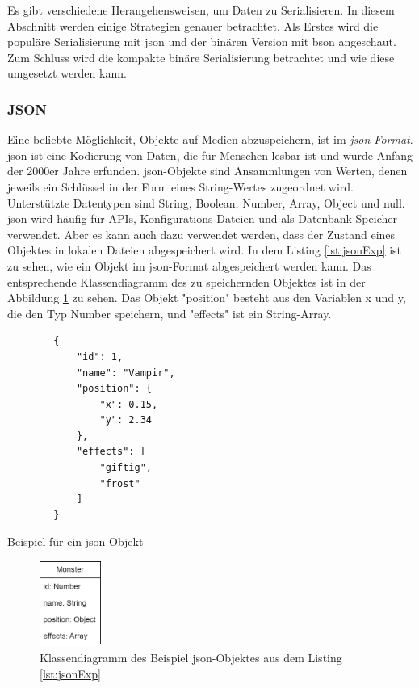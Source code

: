 Es gibt verschiedene Herangehensweisen, um Daten zu Serialisieren. In diesem Abschnitt werden einige Strategien genauer betrachtet. Als Erstes wird die populäre Serialisierung mit \ac{json} und der binären Version mit \ac{bson} angeschaut. Zum Schluss wird die kompakte binäre Serialisierung betrachtet und wie diese umgesetzt werden kann.

\subsubsection{JSON}
Eine beliebte Möglichkeit, Objekte auf Medien abzuspeichern, ist im \textit{\ac{json}-Format}.\cite{prokurainnovationsReasonJSON} \ac{json} ist eine Kodierung von Daten, die für Menschen lesbar ist und wurde Anfang der 2000er Jahre erfunden.\cite{toptalDeepLookJson} \ac{json}-Objekte sind Ansammlungen von Werten, denen jeweils ein Schlüssel in der Form eines String-Wertes zugeordnet wird. Unterstützte Datentypen sind String, Boolean, Number, Array, Object und null. \ac{json} wird häufig für APIs, Konfigurations-Dateien und als Datenbank-Speicher verwendet. Aber es kann auch dazu verwendet werden, dass der Zustand eines Objektes in lokalen Dateien abgespeichert wird.\cite{mongodbJSONBSON} In dem Listing \ref{lst:jsonExp} ist zu sehen, wie ein Objekt im \ac{json}-Format abgespeichert werden kann. Das entsprechende Klassendiagramm des zu speichernden Objektes ist in der Abbildung \ref{fig:monsterBspKlasse} zu sehen. Das Objekt "position" besteht aus den Variablen x und y, die den Typ Number speichern, und "effects" ist ein String-Array. 

\begin{listing}[htp]
    \begin{verbatim}
        {
            "id": 1,
            "name": "Vampir",
            "position": {
                "x": 0.15,
                "y": 2.34
            },
            "effects": [
                "giftig", 
                "frost"
            ]
        }
    \end{verbatim}
    \caption{Beispiel für ein \ac{json}-Objekt}
    \label{lst:jsonExp}
\end{listing}

\begin{figure}[htp]
    \centering
    \includegraphics[width=0.18\textwidth]{images/MonsterBspKlasse.png}
    \caption{Klassendiagramm des Beispiel \ac{json}-Objektes aus dem Listing \ref{lst:jsonExp}}
    \label{fig:monsterBspKlasse}
\end{figure}

